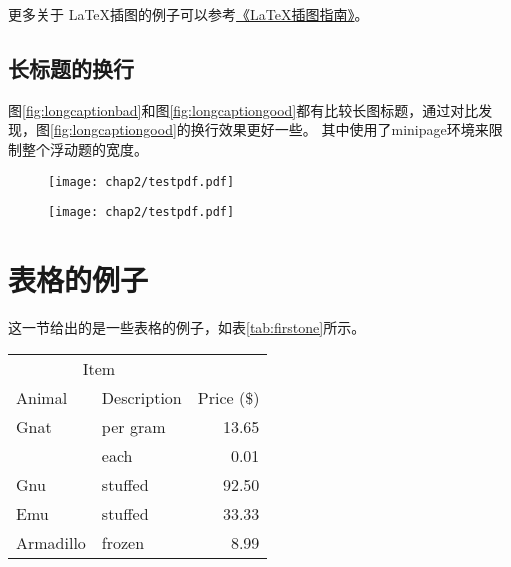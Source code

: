 更多关于 \LaTeX 插图的例子可以参考\href{http://www.cs.duke.edu/junhu/Graphics3.pdf}{《\LaTeX 插图指南》}。

\subsection{长标题的换行}
\label{sec:longcaption}

图\ref{fig:longcaptionbad}和图\ref{fig:longcaptiongood}都有比较长图标题，通过对比发现，图\ref{fig:longcaptiongood}的换行效果更好一些。
其中使用了minipage环境来限制整个浮动题的宽度。

\begin{figure}[!htp]
 \centering
 \texttt{[image: chap2/testpdf.pdf]}
\end{figure}


  \begin{figure}[!hbp]
    \centering
    \begin{minipage}[b]{0.6\textwidth}
      \captionstyle{\centering}
      \centering
      \texttt{[image: chap2/testpdf.pdf]}
    \end{minipage}     
  \end{figure}

  
\section{表格的例子}
\label{sec:tab}

这一节给出的是一些表格的例子，如表\ref{tab:firstone}所示。

\begin{table}[!hpb]
  \centering
  \begin{tabular}{@{}llr@{}} \toprule
    \multicolumn{2}{c}{Item} \\ \cmidrule(r){1-2}
    Animal & Description & Price (\$)\\ \midrule
    Gnat & per gram & 13.65 \\
    & each & 0.01 \\
    Gnu & stuffed & 92.50 \\
    Emu & stuffed & 33.33 \\
    Armadillo & frozen & 8.99 \\ \bottomrule
  \end{tabular}
\end{table}

